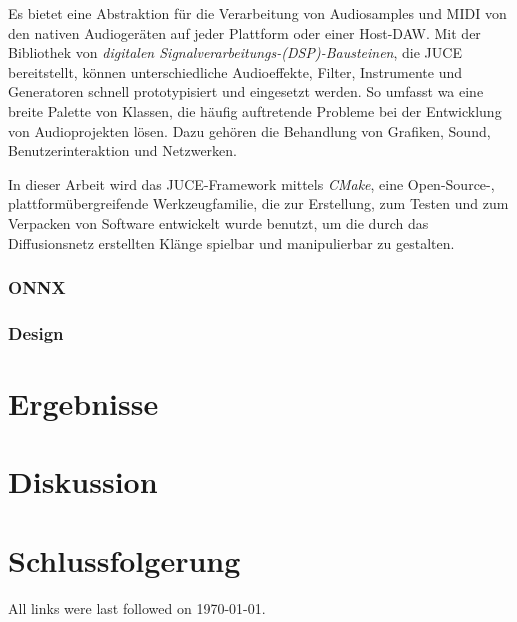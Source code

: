 \documentclass[
  a4paper,  %
  twoside,  %
  bibliography=totoc,
  headsepline,
  cleardoublepage=empty,
  parskip=half,
  draft=false
]{scrbook}
\begin{document}
Es bietet eine Abstraktion für die Verarbeitung von Audiosamples und MIDI von den nativen Audiogeräten auf jeder Plattform oder einer Host-DAW. Mit der Bibliothek von \emph{digitalen Signalverarbeitungs-(DSP)-Bausteinen}, die JUCE bereitstellt, können unterschiedliche Audioeffekte, Filter, Instrumente und Generatoren schnell prototypisiert und eingesetzt werden. \cite{noauthor_juce_nodate} So umfasst wa eine breite Palette von Klassen, die häufig auftretende Probleme bei der Entwicklung von Audioprojekten lösen. Dazu gehören die Behandlung von Grafiken, Sound, Benutzerinteraktion und Netzwerken. \cite{robinson_getting_2013}

In dieser Arbeit wird das JUCE-Framework mittels \emph{CMake}, \glqq eine Open-Source-, plattformübergreifende Werkzeugfamilie, die zur Erstellung, zum Testen und zum Verpacken von Software entwickelt wurde\grqq \cite{noauthor_cmake_nodate} benutzt, um die durch das Diffusionsnetz erstellten Klänge spielbar und manipulierbar zu gestalten. 
\subsection{ONNX}
\subsection{Design}

\chapter{Ergebnisse}

\chapter{Diskussion}

\chapter{Schlussfolgerung}
\label{sec:conclusion}


\printbibliography

All links were last followed on \today{}.

\appendix


\pagestyle{empty}
\renewcommand*{\chapterpagestyle}{empty}
\Affirmation
\end{document}
